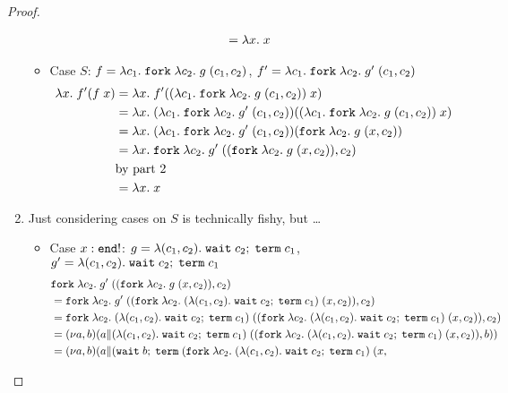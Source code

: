 \begin{proof}
\begin{enumerate}
\begin{itemize}
\begin{align*}
        &= \lambda x.\; x
      \end{align*}
    \item Case $S$: $f = \lambda c_1.\; \mathtt{fork}\;  \lambda c_2.\; g \; (c_1,
        c_2)$, 
      $f' = \lambda c_1.\; \mathtt{fork}\;  \lambda c_2.\; g' \; (c_1, c_2)$
      \begin{align*}
        \lambda x.\; f' (f\; x)
        &= \lambda x.\; f' ((\lambda c_1.\; \mathtt{fork}\;  \lambda c_2.\; g \; (c_1,
          c_2))\; x) \\
        &= \lambda x.\;
          (\lambda c_1.\; \mathtt{fork}\;  \lambda c_2.\; g' \; (c_1, c_2))
          ((\lambda c_1.\; \mathtt{fork}\;  \lambda c_2.\; g \; (c_1, c_2))\; x) \\
        &= \lambda x.\;
          (\lambda c_1.\; \mathtt{fork}\;  \lambda c_2.\; g' \; (c_1, c_2))
          (\mathtt{fork}\;  \lambda c_2.\; g \; (x, c_2)) \\
        &= \lambda x.\;
          \mathtt{fork}\;  \lambda c_2.\; g' \; ((\mathtt{fork}\;  \lambda c_2.\; g \; (x,
          c_2)), c_2) \\
        & \text{by part~2} \\
        & = \lambda x.\; x
      \end{align*}
    \end{itemize}
  \item Just considering cases on $S$ is technically fishy, but \dots
    \begin{itemize}
    \item Case $x : \mathtt{end !}$:
      $g = \lambda (c_1, c_2).\; \mathtt{wait}\; c_2;\; {\mathtt{term}\; c_1}$,
      $g' = \lambda (c_1, c_2).\; \mathtt{wait}\; c_2;\; {\mathtt{term}\; c_1}$
      \begin{align*}
        & 
        \EFork{ \ELam {c_2} g' \; ((\EFork{ \ELam {c_2} g \; (x,
        c_2) }), c_2)} \\
        &=
        \EFork{ \ELam {c_2} g' \; ((\EFork{ \ELam {c_2} (\ELam {(c_1, c_2)} \ELetU {\EWait {c_2}} {\ETerm {c_1}}) \; (x,
        c_2) }), c_2)} \\
        &=
        \EFork{ \ELam {c_2} (\ELam {(c_1, c_2)} \ELetU {\EWait {c_2}} {\ETerm {c_1}}) \; ((\EFork{ \ELam {c_2} (\ELam {(c_1, c_2)} \ELetU {\EWait {c_2}} {\ETerm {c_1}}) \; (x,
        c_2) }), c_2)} \\
        &=
          \PScope
          (\PPar a {(\ELam {(c_1, c_2)} \ELetU {\EWait {c_2}} {\ETerm {c_1}}) \; ((\EFork{ \ELam {c_2} (\ELam {(c_1, c_2)} \ELetU {\EWait {c_2}} {\ETerm {c_1}}) \; (x,
        c_2) }), b)}) \\
        &=
          \PScope
          (\PPar a {(\ELetU {\EWait {b}} {\ETerm {(\EFork{ \ELam {c_2} (\ELam {(c_1, c_2)} \ELetU {\EWait {c_2}} {\ETerm {c_1}}) \; (x,
}}}}
\end{align*}
\end{itemize}
\end{enumerate}
\end{proof}
